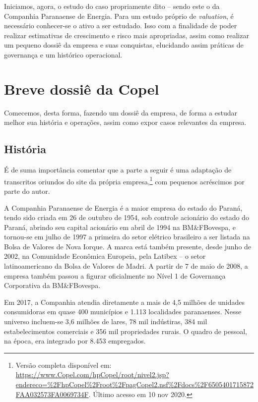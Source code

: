 \documentclass[grad,numbers]{coppe}
\begin{document}
  Iniciamos, agora, o estudo do caso propriamente dito -- sendo este o da Companhia Paranaense de Energia. Para um estudo próprio de \emph{valuation}, é necessário conhecer-se o ativo a ser estudado. Isso com a finalidade de poder realizar estimativas de crescimento e risco mais apropriadas, assim como realizar um pequeno dossiê da empresa e suas conquistas, elucidando assim práticas de governança e um histórico operacional.

  \hypertarget{breve-dossiuxea-da-copel}{%
  \section{Breve dossiê da Copel}\label{breve-dossiuxea-da-copel}}

  Comecemos, desta forma, fazendo um dossiê da empresa, de forma a estudar melhor sua história e operações, assim como expor casos relevantes da empresa.

  \hypertarget{histuxf3ria}{%
  \subsection{História}\label{histuxf3ria}}

  É de suma importância comentar que a parte a seguir é uma adaptação de transcritos oriundos do site da própria empresa,\footnote{Versão completa disponível em: \url{https://www.Copel.com/hpCopel/root/nivel2.jsp?endereco=\%2FhpCopel\%2Froot\%2FpagCopel2.nsf\%2Fdocs\%2F6505401715872FAA032573FA0069734F}. Último acesso em 10 nov 2020.} com pequenos acréscimos por parte do autor.

  A Companhia Paranaense de Energia é a maior empresa do estado do Paraná, tendo sido criada em 26 de outubro de 1954, sob controle acionário do estado do Paraná, abrindo seu capital acionário em abril de 1994 na BM\&FBovespa, e tornou-se em julho de 1997 a primeira do setor elétrico brasileiro a ser listada na Bolsa de Valores de Nova Iorque. A marca está também presente, desde junho de 2002, na Comunidade Econômica Europeia, pela Latibex -- o setor latinoamericano da Bolsa de Valores de Madri. A partir de 7 de maio de 2008, a empresa também passou a figurar oficialmente no Nível 1 de Governança Corporativa da BM\&FBovespa.

  Em 2017, a Companhia atendia diretamente a mais de 4,5 milhões de unidades consumidoras em quase 400 municípios e 1.113 localidades paranaenses. Nesse universo incluem-se 3,6 milhões de lares, 78 mil indústiras, 384 mil estabelecimentos comerciais e 356 mil propriedades rurais. O quadro de pessoal, na época, era integrado por 8.453 empregados.
\end{document}
